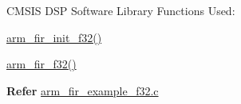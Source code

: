 \begin{DoxyParagraph}{C\-M\-S\-I\-S D\-S\-P Software Library Functions Used\-:}

\end{DoxyParagraph}
\begin{DoxyParagraph}{}

\begin{DoxyItemize}
\item \hyperlink{group___f_i_r_ga98d13def6427e29522829f945d0967db}{arm\-\_\-fir\-\_\-init\-\_\-f32()}
\item \hyperlink{group___f_i_r_gae8fb334ea67eb6ecbd31824ddc14cd6a}{arm\-\_\-fir\-\_\-f32()}
\end{DoxyItemize}
\end{DoxyParagraph}
{\bfseries  Refer } \hyperlink{arm_fir_example_f32_8c-example}{arm\-\_\-fir\-\_\-example\-\_\-f32.\-c} 